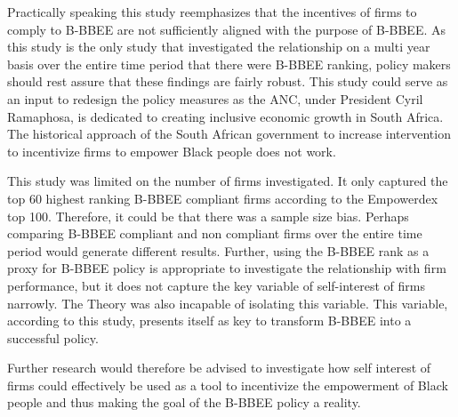 Practically speaking this study reemphasizes that the incentives of firms to comply to B-BBEE are not sufficiently aligned with the purpose of B-BBEE. As this study is the only study that investigated the relationship on a multi year basis over the entire time period that there were B-BBEE ranking, policy makers should rest assure that these findings are fairly robust. This study could serve as an input to redesign the policy measures as the ANC, under President Cyril Ramaphosa, is dedicated to creating inclusive economic growth in South Africa. The historical approach of the South African government to increase intervention to incentivize firms to empower Black people does not work.

This study was limited on the number of firms investigated. It only captured the top 60 highest ranking B-BBEE compliant firms according to the Empowerdex top 100. Therefore, it could be that there was a sample size bias. Perhaps comparing B-BBEE compliant and non compliant firms over the entire time period would generate different results. Further, using the B-BBEE rank as a proxy for B-BBEE policy is appropriate to investigate the relationship with firm performance, but it does not capture the key variable of self-interest of firms narrowly. The Theory was also incapable of isolating this variable. This variable, according to this study, presents itself as key to transform B-BBEE into a successful policy. 

Further research would therefore be advised to investigate how self interest of firms could effectively be used as a tool to incentivize the empowerment of Black people and thus making the goal of the B-BBEE policy a reality. 